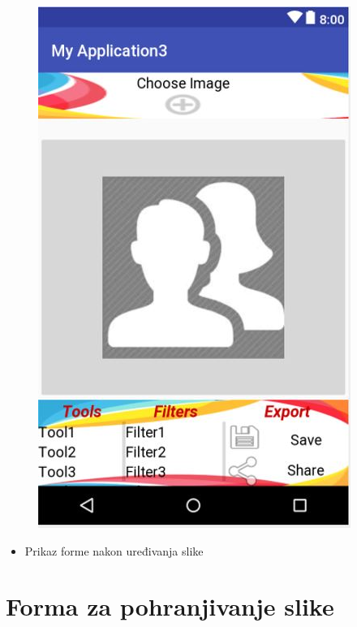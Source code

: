 \documentclass[12pt]{scrreprt}
\begin{document}
\begin{figure}[h]
	\begin{Center}
		\includegraphics{image7}
	\end{Center}
\end{figure}

\begin{itemize}
	\item Prikaz forme nakon uređivanja slike
\end{itemize}

\break
\section{Forma za pohranjivanje slike}
\end{document}

